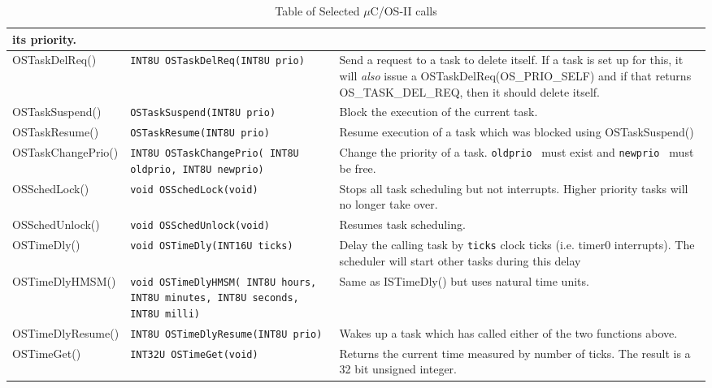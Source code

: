 \begin{table}
\begin{center}
\begin{tabular}{|l|p{1.6in}|p{2.75in} |}
                its priority. \\ \hline
OSTaskDelReq() & {\tt INT8U OSTaskDelReq(INT8U prio) }  &
                Send a request to a task to delete itself.   If a task is
                set up for this, it will {\it also} issue a
                OSTaskDelReq(OS\_PRIO\_SELF) and if that returns
                OS\_TASK\_DEL\_REQ, then it should delete itself.  \\ \hline
OSTaskSuspend() & {\tt OSTaskSuspend(INT8U prio)}       &
                Block the execution of the current task.    \\ \hline
OSTaskResume()  & {\tt OSTaskResume(INT8U prio)}        &
                Resume execution of a task which was blocked using
                OSTaskSuspend()  \\ \hline
OSTaskChangePrio()& {\tt INT8U OSTaskChangePrio( INT8U oldprio, INT8U newprio)} &
                Change the priority of a task.  {\tt oldprio } must exist
                and {\tt newprio } must be free.    \\ \hline
OSSchedLock()   & {\tt void OSSchedLock(void)} &
                Stops all task scheduling but not interrupts.
                Higher priority tasks will no longer take over. \\ \hline
OSSchedUnlock() & {\tt void OSSchedUnlock(void)} &
                Resumes task scheduling. \\ \hline
OSTimeDly()     & {\tt void OSTimeDly(INT16U ticks)} &
                Delay the calling task by {\tt ticks} clock ticks (i.e. timer0
                interrupts).  The scheduler will start other tasks during
                this delay       \\ \hline
OSTimeDlyHMSM() & {\tt void OSTimeDlyHMSM( INT8U hours, INT8U minutes, INT8U seconds, INT8U milli) }    &
                Same as ISTimeDly() but uses natural time units.         \\ \hline
OSTimeDlyResume()       & {\tt INT8U OSTimeDlyResume(INT8U prio) }      &
                Wakes up a task which has called either of the two functions
                above.   \\ \hline
OSTimeGet()     & {\tt INT32U OSTimeGet(void)}  &
                Returns the current time measured by number of ticks.
                The result is a 32 bit unsigned integer.  \\ \hline

\end{tabular}
\caption{Table of Selected $\mu$C/OS-II calls}
\label{Ta:FC0}
\end{center}
\end{table}

